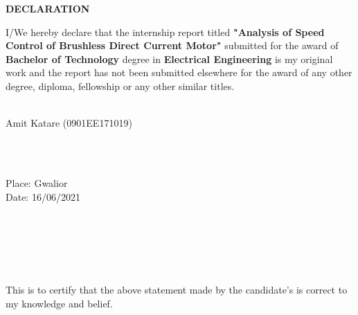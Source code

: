 \documentclass[12pt,openright,twoside]{report}
\begin{document}
\newpage
{}
\vspace*{-0.3cm}

\begin{center}  {\normalsize \bf DECLARATION}\\
\end{center}

\justify
\doublespace
I/We hereby declare that the internship report titled \textbf{"Analysis of Speed Control of Brushless Direct Current Motor"} submitted for the award of \textbf{Bachelor of Technology} degree in \textbf{Electrical Engineering} is my original work and the report has not been submitted elsewhere for the award of any other degree, diploma, fellowship or any other similar titles. 
\\[0.8cm]
\begin{minipage}{1\textwidth}
\begin{flushright} \normalsize\\

Amit Katare (0901EE171019)\\[0cm]
\end{flushright}
\end{minipage}\\[0.4cm]
\begin{minipage}{1\textwidth}
\begin{flushleft} \normalsize\\
Place:                                                            Gwalior\\
Date: 16/06/2021
\end{flushleft}
\end{minipage}\\[0.4cm]
\begin{minipage}{1\textwidth}
\begin{flushright} \normalsize\\
\hline
\end{flushright}
\end{minipage}\\[0.4cm]
\begin{minipage}{1\textwidth}
\begin{flushleft} 
This is to certify that the above statement made by the candidate’s is correct to my knowledge and belief.
\end{flushleft}
\end{minipage}\\[1.2cm]
\end{document}
